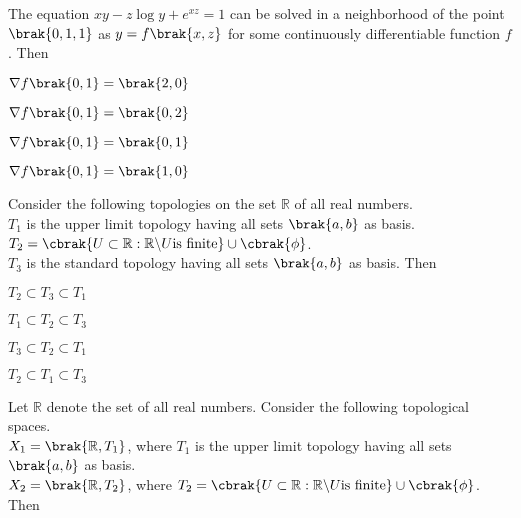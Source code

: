 \iffalse
  \author{EE24BTECH11007}
  \section{ma}
  \chapter{2021}
\fi
\item The equation $xy-z\log{y}+e^{xz} = 1$ can be solved in a neighborhood of the point $\brak{0, 1, 1}$ as $y = f\brak{x, z}$ for some continuously differentiable function $f$. Then
\begin{enumerate}
\begin{multicols}{2}
\item $\nabla f\brak{0, 1} = \brak{2, 0}$
\item $\nabla f\brak{0, 1} = \brak{0, 2}$
\item $\nabla f\brak{0, 1} = \brak{0, 1}$
\item $\nabla f\brak{0, 1} = \brak{1, 0}$
\end{multicols}
\end{enumerate}
\item Consider the following topologies on the set $\mathbb{R}$ of all real numbers.\\
$T_1$ is the upper limit topology having all sets $\brak{a, b}$ as basis.\\
$T_2=\cbrak{U\subset \mathbb{R}: \mathbb{R}\backslash U \text{is finite}}\cup \cbrak{\phi}$.\\
$T_3$ is the standard topology having all sets $\brak{a, b}$ as basis. Then
\begin{enumerate}
\begin{multicols}{4}
\item $T_2\subset T_3\subset T_1$
\item $T_1\subset T_2\subset T_3$
\item $T_3\subset T_2\subset T_1$
\item $T_2\subset T_1\subset T_3$
\end{multicols}
\end{enumerate}
\item Let $\mathbb{R}$ denote the set of all real numbers. Consider the following topological spaces.\\
$X_1 = \brak{\mathbb{R}, T_1}$, where $T_1$ is the upper limit topology having all sets $\brak{a, b}$ as basis.\\
$X_2=\brak{\mathbb{R}, T_2}$, where $T_2=\cbrak{U\subset \mathbb{R}: \mathbb{R}\backslash U \text{is finite}} \cup \cbrak{\phi}$. Then
